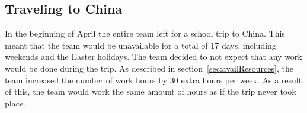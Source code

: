 \subsection{Traveling to China}
In the beginning of April the entire team left for a school trip to China. This meant that the team would be unavailable for a total of 17 days, including weekends and the Easter holidays. The team decided to not expect that any work would be done during the trip. As described in section~\ref{sec:availResources}, the team increased the number of work hours by 30 extra hours per week. As a result of this, the team would work the same amount of hours as if the trip never took place.
